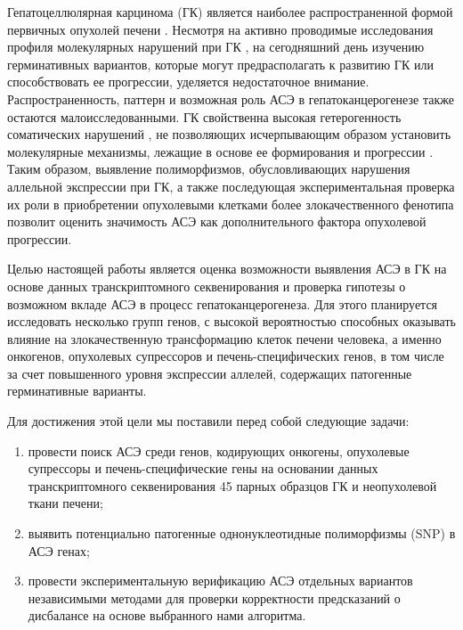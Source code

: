 Гепатоцеллюлярная карцинома (ГК) является наиболее распространенной формой первичных опухолей печени \cite{farazi_hepatocellular_2006}. Несмотря на активно проводимые исследования профиля молекулярных нарушений при ГК \cite{cancer_genome_atlas_research_network._electronic_address:_wheelerbcm.edu_comprehensive_2017}, на сегодняшний день изучению герминативных вариантов, которые могут предрасполагать к развитию ГК или способствовать ее прогрессии, уделяется недостаточное внимание. Распространенность, паттерн и возможная роль АСЭ в гепатоканцерогенезе также остаются малоисследованными. ГК свойственна высокая гетерогенность соматических нарушений \cite{cancer_genome_atlas_research_network._electronic_address:_wheelerbcm.edu_comprehensive_2017}, не позволяющих исчерпывающим образом установить молекулярные механизмы, лежащие в основе ее формирования и прогрессии \cite{lawrence_discovery_2014}. Таким образом, выявление полиморфизмов, обусловливающих нарушения аллельной экспрессии при ГК, а также последующая экспериментальная проверка их роли в приобретении опухолевыми клетками более злокачественного фенотипа позволит оценить значимость АСЭ как дополнительного фактора опухолевой прогрессии.

Целью настоящей работы является оценка возможности выявления АСЭ в ГК на основе данных транскриптомного секвенирования и проверка гипотезы о возможном вкладе АСЭ в процесс гепатоканцерогенеза. Для этого планируется исследовать несколько групп генов, с высокой вероятностью способных оказывать влияние на злокачественную трансформацию клеток печени человека, а именно онкогенов, опухолевых супрессоров и печень-специфических генов, в том числе за счет повышенного уровня экспрессии аллелей, содержащих патогенные герминативные варианты.

Для достижения этой цели мы поставили перед собой следующие задачи:
\begin{enumerate}
	\item провести поиск АСЭ среди генов, кодирующих онкогены, опухолевые супрессоры и печень-специфические гены на основании данных транскриптомного секвенирования 45 парных образцов ГК и неопухолевой ткани печени;
	\item выявить потенциально патогенные однонуклеотидные полиморфизмы (SNP) в АСЭ генах;
	\item провести экспериментальную верификацию АСЭ отдельных вариантов независимыми методами для проверки корректности предсказаний о дисбалансе на основе выбранного нами алгоритма.
\end{enumerate}